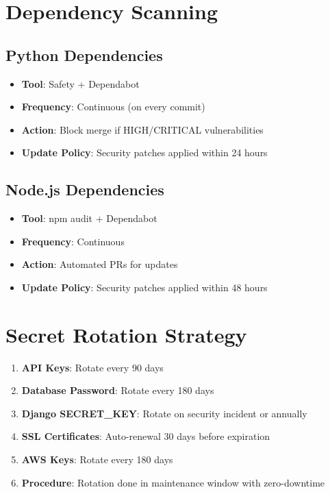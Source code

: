 \documentclass{report}
\begin{document}
\section{Dependency Scanning}

\subsection{Python Dependencies}

\begin{itemize}
  \item \textbf{Tool}: Safety + Dependabot
  \item \textbf{Frequency}: Continuous (on every commit)
  \item \textbf{Action}: Block merge if HIGH/CRITICAL vulnerabilities
  \item \textbf{Update Policy}: Security patches applied within 24 hours
\end{itemize}

\subsection{Node.js Dependencies}

\begin{itemize}
  \item \textbf{Tool}: npm audit + Dependabot
  \item \textbf{Frequency}: Continuous
  \item \textbf{Action}: Automated PRs for updates
  \item \textbf{Update Policy}: Security patches applied within 48 hours
\end{itemize}

\section{Secret Rotation Strategy}

\begin{enumerate}
  \item \textbf{API Keys}: Rotate every 90 days
  \item \textbf{Database Password}: Rotate every 180 days
  \item \textbf{Django SECRET\_KEY}: Rotate on security incident or annually
  \item \textbf{SSL Certificates}: Auto-renewal 30 days before expiration
  \item \textbf{AWS Keys}: Rotate every 180 days
  \item \textbf{Procedure}: Rotation done in maintenance window with zero-downtime
\end{enumerate}
\end{document}
